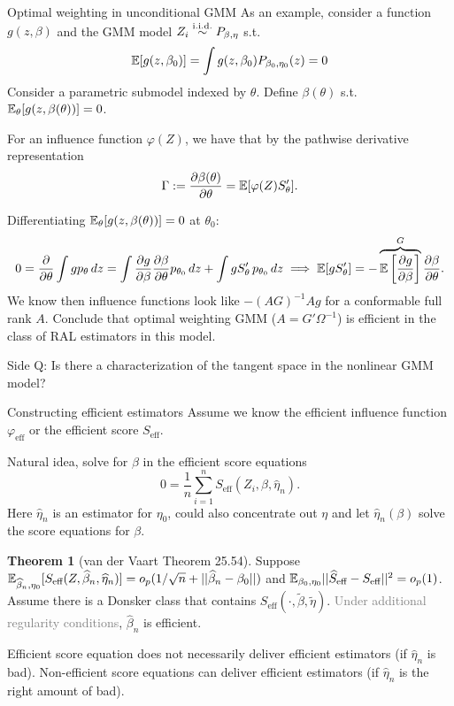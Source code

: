 \documentclass[10pt,aspectratio=169,handout]{beamer}
\theoremstyle{definition}
\newtheorem{thm}{Theorem}
\newcommand{\light}[1]{\textcolor{gray}{#1}}
\begin{document}
\begin{frame}{Optimal weighting in unconditional GMM}
\small
    As an example, consider a function $g(z,\beta)$ and the GMM model $Z_i
    \overset{\mathrm{i.i.d.}}{\sim} P_{\beta,\eta}$ s.t. \[
    \mathbb{E}[g(z,\beta_0)] = \int g(z,\beta_0) P_{\beta_0,\eta_0}(z) = 0
    \]
    Consider a parametric submodel indexed by $\theta$. Define $\beta
    (\theta)$ s.t. $\mathbb{E}_{\theta}[g(z,\beta(\theta))] = 0$. 
    
    
    For an influence function $\varphi(Z)$, we have that by the pathwise
    derivative representation \[
    \Gamma := \frac{\partial{\beta(\theta)}}{\partial{\theta}} = \mathbb{E}[\varphi(Z) S_\theta'].
    \]
      
    Differentiating $\mathbb{E}_\theta[g(z,\beta(\theta))] = 0$ at $\theta_0$:
    \vspace{-1em}
    \[
    0 = \frac{\partial{}}{\partial{\theta}} \int g p_\theta\,dz = \int \frac{\partial{g}}{\partial{\beta}} 
    \frac{\partial{\beta}}{\partial{\theta}} p_{\theta_0}\,dz +
    \int g S_\theta'\,p_{\theta_0}\,dz \implies \mathbb{E}[g S_\theta'] = -
    \overbrace{\mathbb{E}
    \left[{\frac{\partial{g}}{\partial{\beta}}}\right]}^{G} \frac{\partial{\beta}}{\partial{\theta}}.
    \]
    We know then influence functions look like $-(AG)^{-1} Ag$ for a conformable
    full rank $A$. Conclude that optimal weighting GMM ($A = G'\Omega^ {-1}$) is
    efficient
    \alert{in the class of RAL estimators in this model}.
    
    Side Q: Is there a characterization of the tangent space in the
    nonlinear GMM model?
\end{frame}

\begin{frame}{Constructing efficient estimators}
\small
Assume we know the efficient influence function $\varphi_{\text{eff}}$ or
the efficient score $S_{\text{eff}}$. 

Natural idea, solve for $\beta$ in
the \alert{efficient score equations} \[
0 = \frac{1}{n}\sum_{i=1}^n S_{\text{eff}}(Z_i,
\beta, \hat \eta_n).
\]
Here $\hat \eta_n$ is an estimator for $\eta_0$, could also concentrate out
$\eta$ and let $\hat \eta_n(\beta)$ solve the score equations for $\beta$. 
\begin{thm}[van der Vaart Theorem 25.54]
  Suppose $\mathbb{E}_{\widehat\beta_n,\eta_0}[S_\text{eff}(Z, \widehat\beta_n,
  \widehat\eta_n)] = o_p(1/\sqrt{n} + ||\widehat \beta_n - \beta_0||)$ and $\mathbb{E}_
  {\beta_0, \eta_0}||\widehat S_\text{eff} - S_\text{eff}||^2 = o_p(1)$. Assume
there is a Donsker class that contains $S_{\text{eff}}(\cdot,
\tilde \beta, \tilde \eta)$. \light{Under additional regularity
conditions},
  $\hat\beta_n$ is efficient.
\end{thm}

\begin{rmk}
  Efficient score equation does not necessarily deliver efficient
  estimators (if $\hat\eta_n$ is bad). Non-efficient score equations can
  deliver efficient
  estimators (if $\hat \eta_n$ is the right amount of bad).
\end{rmk}

  
\end{frame}
\end{document}
